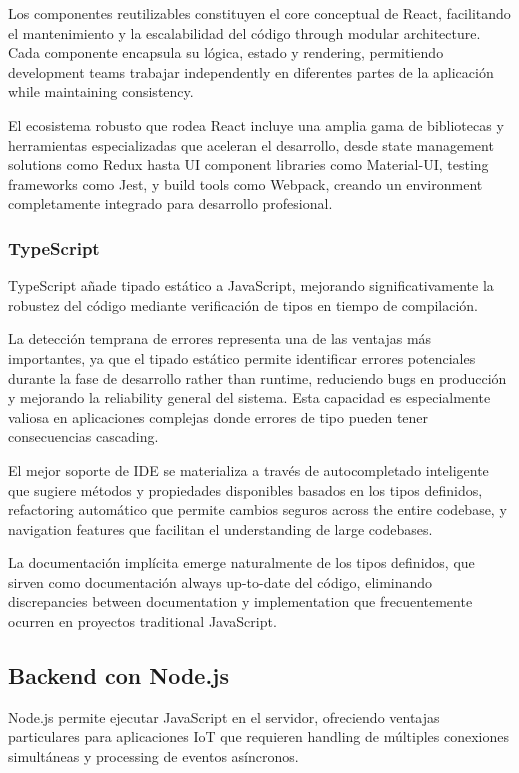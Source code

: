 Los componentes reutilizables constituyen el core conceptual de React, facilitando el mantenimiento y la escalabilidad del código through modular architecture. Cada componente encapsula su lógica, estado y rendering, permitiendo development teams trabajar independently en diferentes partes de la aplicación while maintaining consistency.

El ecosistema robusto que rodea React incluye una amplia gama de bibliotecas y herramientas especializadas que aceleran el desarrollo, desde state management solutions como Redux hasta UI component libraries como Material-UI, testing frameworks como Jest, y build tools como Webpack, creando un environment completamente integrado para desarrollo profesional.

\subsubsection{TypeScript}

TypeScript añade tipado estático a JavaScript, mejorando significativamente la robustez del código mediante verificación de tipos en tiempo de compilación.

La detección temprana de errores representa una de las ventajas más importantes, ya que el tipado estático permite identificar errores potenciales durante la fase de desarrollo rather than runtime, reduciendo bugs en producción y mejorando la reliability general del sistema. Esta capacidad es especialmente valiosa en aplicaciones complejas donde errores de tipo pueden tener consecuencias cascading.

El mejor soporte de IDE se materializa a través de autocompletado inteligente que sugiere métodos y propiedades disponibles basados en los tipos definidos, refactoring automático que permite cambios seguros across the entire codebase, y navigation features que facilitan el understanding de large codebases.

La documentación implícita emerge naturalmente de los tipos definidos, que sirven como documentación always up-to-date del código, eliminando discrepancies between documentation y implementation que frecuentemente ocurren en proyectos traditional JavaScript.

\subsection{Backend con Node.js}

Node.js permite ejecutar JavaScript en el servidor, ofreciendo ventajas particulares para aplicaciones IoT que requieren handling de múltiples conexiones simultáneas y processing de eventos asíncronos.

